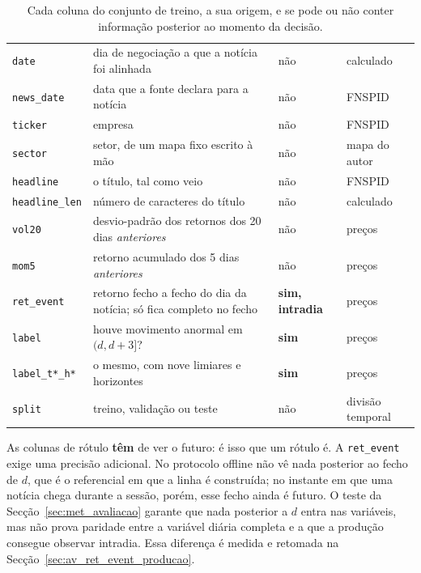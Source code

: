 \begin{table}[ht]
\caption[O dicionário de colunas]{Cada coluna do conjunto de treino, a sua origem, e se pode ou não
conter informação posterior ao momento da decisão.}
\label{tab:met_colunas}
\centering
\small
\begin{tabular}{L{0.20\textwidth} L{0.40\textwidth} C{0.13\textwidth} L{0.15\textwidth}}
\toprule
{} &  &  &  \\
\midrule
\texttt{date} & dia de negociação a que a notícia foi alinhada & não & calculado \\
\texttt{news\_date} & data que a fonte declara para a notícia & não & \gls{FNSPID} \\
\texttt{ticker} & empresa & não & \gls{FNSPID} \\
\texttt{sector} & setor, de um mapa fixo escrito à mão & não & mapa do autor \\
\texttt{headline} & o título, tal como veio & não & \gls{FNSPID} \\
\texttt{headline\_len} & número de caracteres do título & não & calculado \\
\texttt{vol20} & desvio-padrão dos retornos dos 20 dias \emph{anteriores} & não & preços \\
\texttt{mom5} & retorno acumulado dos 5 dias \emph{anteriores} & não & preços \\
\texttt{ret\_event} & retorno fecho a fecho do dia da notícia; só fica completo no fecho &
\textbf{sim, intradia} & preços \\
\texttt{label} & houve movimento anormal em $(d, d{+}3]$? & \textbf{sim} & preços \\
\texttt{label\_t*\_h*} & o mesmo, com nove limiares e horizontes & \textbf{sim} & preços \\
\texttt{split} & treino, validação ou teste & não & divisão temporal \\
\bottomrule
\end{tabular}
\end{table}

As colunas de rótulo \textbf{têm} de ver o futuro: é isso que um rótulo é. A
\texttt{ret\_event} exige uma precisão adicional. No protocolo offline não vê nada posterior ao
fecho de $d$, que é o referencial em que a linha é construída; no instante em que uma notícia chega
durante a sessão, porém, esse fecho ainda é futuro. O teste da Secção~\ref{sec:met_avaliacao}
garante que nada posterior a $d$ entra nas variáveis, mas não prova paridade entre a variável diária
completa e a que a produção consegue observar intradia. Essa diferença é medida e retomada na
Secção~\ref{sec:av_ret_event_producao}.

